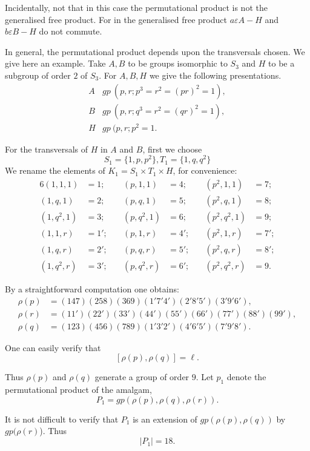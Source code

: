 Incidentally, not that in this case the permutational product is not
the generalised free product. For in the generalised free product $a
\varepsilon A - H$ and $b \varepsilon B-H$ do not commute. 
 
In general, the permutational product depends upon the transversals
chosen. We give here an example. Take $A,B$ to be groups isomorphic to
$S_3$ and $H$ to be a subgroup of order $2$ of $S_3$. For $A, B, H$ we
give the following presentations. 
\begin{align*}
  A & gp~(p,r; p^3 = r^2 = (p r)^2 = 1), \\
  B & gp~(p,r; q^3 = r^2 = (q r)^2 = 1), \\
  H & gp~(p,r; p^2 = 1.
\end{align*}
 
For the transversals of $H$ in $A$ and $B$, first we choose
$$
S_1 =\bigg \{1,  p, p^2 \bigg\}, T_1 =\bigg \{1, q, q ^2\bigg\}
$$
We rename the elements of $K_1 = S_1 \times T_1 \times H$, for
convenience: 
\begin{alignat*}{6}
  (1, 1, 1) & = 1; &(p, 1,1) &= 4; \quad &(p^2,  1, 1) & = 7; \\
  (1, q, 1) & = 2; &(p, q,1) &= 5; &(p^2,  q, 1) &= 8; \\
  (1, q^2, 1) & = 3; &(p, q^2,1) &= 6; &(p^2,  q^2, 1) &= 9; \\
  (1, 1, r) & = 1'; &(p, 1,r) &= 4'; &(p^2,  1, r) &= 7'; \\
  (1, q, r) & = 2'; \quad &(p, q, r) &= 5';\quad  &(p^2,  q, r) &= 8'; \\
  (1, q^2, r) & = 3'; &(p, q^2, r) &= 6'; &(p^2,  q^2, r) &= 9.
\end{alignat*}
 
By a straightforward  computation one obtains:
\begin{align*}
  \rho(p) & = (147) (258)(369) (1' 7' 4') (2' 8' 5') (3' 9' 6'),\\
  \rho(r) & = (11') (22') (33') (44') (55') (66') (77') (88')(99'), \\
  \rho(q) & = (123) (456) (789) (1' 3' 2') (4' 6' 5') (7' 9' 8').
\end{align*}
 
One can easily verify that 
$$
[\rho (p), \rho(q)] = \ell.
$$ 	

Thus $\rho(p)$ and $\rho(q)$ generate a group of order $9$. Let $p_1$
denote the permutational product of the amalgam, 
$$
P_1 = gp (\rho(p), \rho(q), \rho(r)).
$$

It is not difficult to verify that $P_1$ is an extension of $gp
(\rho(p), \rho(q))$ by $gp(\rho(r)$). Thus  
$$
|P_1| = 18.
$$

